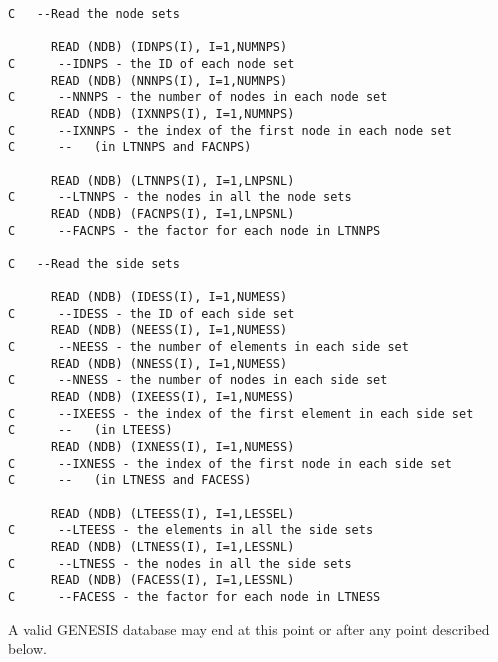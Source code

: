 \newpage
\begin{verbatim}
C   --Read the node sets

      READ (NDB) (IDNPS(I), I=1,NUMNPS)
C      --IDNPS - the ID of each node set
      READ (NDB) (NNNPS(I), I=1,NUMNPS)
C      --NNNPS - the number of nodes in each node set
      READ (NDB) (IXNNPS(I), I=1,NUMNPS)
C      --IXNNPS - the index of the first node in each node set
C      --   (in LTNNPS and FACNPS)

      READ (NDB) (LTNNPS(I), I=1,LNPSNL)
C      --LTNNPS - the nodes in all the node sets
      READ (NDB) (FACNPS(I), I=1,LNPSNL)
C      --FACNPS - the factor for each node in LTNNPS

C   --Read the side sets

      READ (NDB) (IDESS(I), I=1,NUMESS)
C      --IDESS - the ID of each side set
      READ (NDB) (NEESS(I), I=1,NUMESS)
C      --NEESS - the number of elements in each side set
      READ (NDB) (NNESS(I), I=1,NUMESS)
C      --NNESS - the number of nodes in each side set
      READ (NDB) (IXEESS(I), I=1,NUMESS)
C      --IXEESS - the index of the first element in each side set
C      --   (in LTEESS)
      READ (NDB) (IXNESS(I), I=1,NUMESS)
C      --IXNESS - the index of the first node in each side set
C      --   (in LTNESS and FACESS)

      READ (NDB) (LTEESS(I), I=1,LESSEL)
C      --LTEESS - the elements in all the side sets
      READ (NDB) (LTNESS(I), I=1,LESSNL)
C      --LTNESS - the nodes in all the side sets
      READ (NDB) (FACESS(I), I=1,LESSNL)
C      --FACESS - the factor for each node in LTNESS
\end{verbatim}
\newpage

A valid GENESIS database may end at this point or after any point
described below. 


